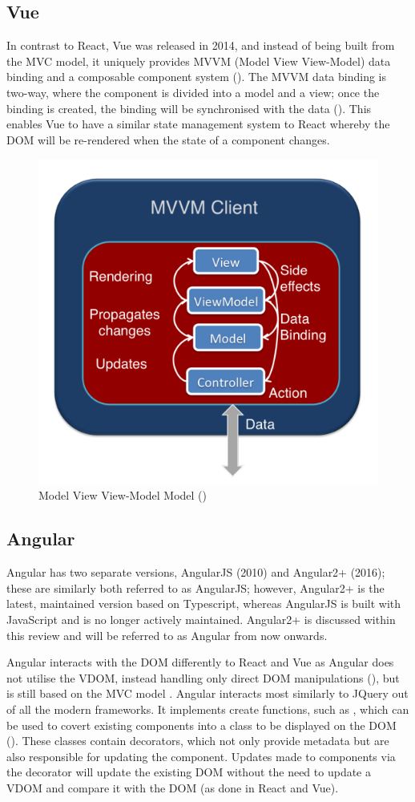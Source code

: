 \subsection{Vue}
\label{litrev:vue}

In contrast to React, Vue was released in 2014, and instead of being built from the MVC model, it uniquely provides MVVM (Model View View-Model) data binding and a composable component system (\cite{xu_benchmark_nodate}). The MVVM data binding is two-way, where the component is divided into a model and a view; once the binding is created, the binding will be synchronised with the data (\cite{li_research_2021}). This enables Vue to have a similar state management system to React whereby the DOM will be re-rendered when the state of a component changes.

\begin{figure}
    \centering
    \includegraphics[width=0.5\linewidth]{figures/MVVM.png}
    \caption{Model View View-Model Model (\cite{zaris_-depth_nodate})}
    \label{fig:mvvm}
\end{figure}

\subsection{Angular}
\label{litrev:angular}
Angular has two separate versions, AngularJS (2010) and Angular2+ (2016); these are similarly both referred to as AngularJS; however, Angular2+ is the latest, maintained version based on Typescript, whereas AngularJS is built with JavaScript and is no longer actively maintained. Angular2+ is discussed within this review and will be referred to as Angular from now onwards.

Angular interacts with the DOM differently to React and Vue as Angular does not utilise the VDOM, instead handling only direct DOM manipulations (\cite{levlin_dom_2020}), but is still based on the MVC model . Angular interacts most similarly to JQuery out of all the modern frameworks. It implements create functions, such as , which can be used to covert existing components into a class to be displayed on the DOM (\cite{levlin_dom_2020}). These classes contain decorators, which not only provide metadata but are also responsible for updating the component. Updates made to components via the decorator will update the existing DOM without the need to update a VDOM and compare it with the DOM (as done in React and Vue).

